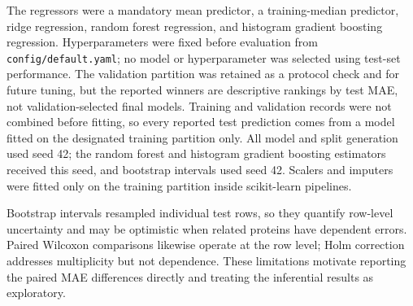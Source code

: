 The regressors were a mandatory mean predictor, a training-median predictor, ridge regression, random forest regression, and histogram gradient boosting regression. Hyperparameters were fixed before evaluation from \texttt{config/default.yaml}; no model or hyperparameter was selected using test-set performance. The validation partition was retained as a protocol check and for future tuning, but the reported winners are descriptive rankings by test MAE, not validation-selected final models. Training and validation records were not combined before fitting, so every reported test prediction comes from a model fitted on the designated training partition only. All model and split generation used seed 42; the random forest and histogram gradient boosting estimators received this seed, and bootstrap intervals used seed 42. Scalers and imputers were fitted only on the training partition inside scikit-learn pipelines.

Bootstrap intervals resampled individual test rows, so they quantify row-level uncertainty and may be optimistic when related proteins have dependent errors. Paired Wilcoxon comparisons likewise operate at the row level; Holm correction addresses multiplicity but not dependence. These limitations motivate reporting the paired MAE differences directly and treating the inferential results as exploratory.
